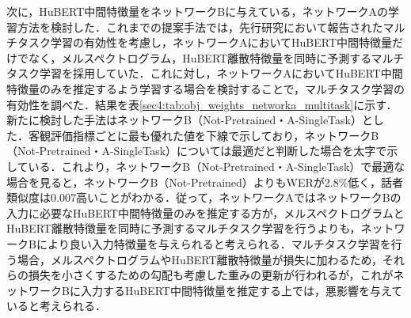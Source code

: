 \documentclass[12pt]{jarticle}
\numberwithin{equation}{section}    %
\numberwithin{figure}{section}      %
\numberwithin{table}{section}      %
\begin{document}
次に，HuBERT中間特徴量をネットワークBに与えている，ネットワークAの学習方法を検討した．これまでの提案手法では，先行研究\cite{kim2023lip_multitask, choi2023intelligible}において報告されたマルチタスク学習の有効性を考慮し，ネットワークAにおいてHuBERT中間特徴量だけでなく，メルスペクトログラム，HuBERT離散特徴量を同時に予測するマルチタスク学習を採用していた．これに対し，ネットワークAにおいてHuBERT中間特徴量のみを推定するよう学習する場合を検討することで，マルチタスク学習の有効性を調べた．結果を表\ref{sec4:tab:obj_weights_networka_multitask}に示す．新たに検討した手法はネットワークB（Not-Pretrained・A-SingleTask）とした．客観評価指標ごとに最も優れた値を下線で示しており，ネットワークB（Not-Pretrained・A-SingleTask）については最適だと判断した場合を太字で示している．これより，ネットワークB（Not-Pretrained・A-SingleTask）で最適な場合を見ると，ネットワークB（Not-Pretrained）よりもWERが2.8\%低く，話者類似度は0.007高いことがわかる．従って，ネットワークAではネットワークBの入力に必要なHuBERT中間特徴量のみを推定する方が，メルスペクトログラムとHuBERT離散特徴量を同時に予測するマルチタスク学習を行うよりも，ネットワークBにより良い入力特徴量を与えられると考えられる．マルチタスク学習を行う場合，メルスペクトログラムやHuBERT離散特徴量が損失に加わるため，それらの損失を小さくするための勾配も考慮した重みの更新が行われるが，これがネットワークBに入力するHuBERT中間特徴量を推定する上では，悪影響を与えていると考えられる．
\end{document}
